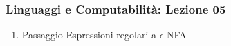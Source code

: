 




\begin{frame}[fragile]
	\frametitle{Linguaggi e Computabilità: Lezione 05}
\begin{enumerate}
\item
Passaggio Espressioni regolari a $\epsilon$-NFA
\end{enumerate}
\end{frame}



